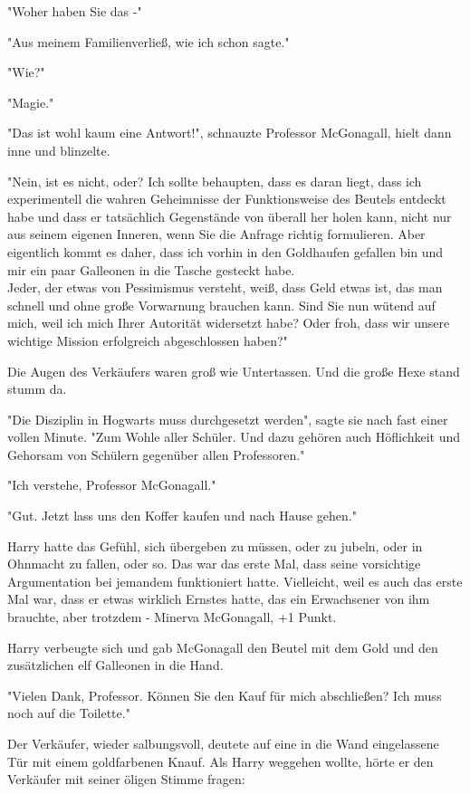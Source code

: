 {"Woher haben Sie das -"

"Aus meinem Familienverließ, wie ich schon sagte."

"Wie?"

"Magie."

"Das ist wohl kaum eine Antwort!", schnauzte Professor McGonagall, hielt dann inne und blinzelte.

"Nein, ist es nicht, oder? Ich sollte behaupten, dass es daran liegt, dass ich experimentell die wahren Geheimnisse der Funktionsweise des Beutels entdeckt habe und dass er tatsächlich Gegenstände von überall her holen kann, nicht nur aus seinem eigenen Inneren, wenn Sie die Anfrage richtig formulieren. Aber eigentlich kommt es daher, dass ich vorhin in den Goldhaufen gefallen bin und mir ein paar Galleonen in die Tasche gesteckt habe.\\ Jeder, der etwas von Pessimismus versteht, weiß, dass Geld etwas ist, das man schnell und ohne große Vorwarnung brauchen kann. Sind Sie nun wütend auf mich, weil ich mich Ihrer Autorität widersetzt habe? Oder froh, dass wir unsere wichtige Mission erfolgreich abgeschlossen haben?"

Die Augen des Verkäufers waren groß wie Untertassen. Und die große Hexe stand stumm da.

"Die Disziplin in Hogwarts muss durchgesetzt werden", sagte sie nach fast einer vollen Minute. "Zum Wohle aller Schüler. Und dazu gehören auch Höflichkeit und Gehorsam von Schülern gegenüber allen Professoren."

"Ich verstehe, Professor McGonagall."

"Gut. Jetzt lass uns den Koffer kaufen und nach Hause gehen."

Harry hatte das Gefühl, sich übergeben zu müssen, oder zu jubeln, oder in Ohnmacht zu fallen, oder so. Das war das erste Mal, dass seine vorsichtige Argumentation bei jemandem funktioniert hatte. Vielleicht, weil es auch das erste Mal war, dass er etwas wirklich Ernstes hatte, das ein Erwachsener von ihm brauchte, aber trotzdem - Minerva McGonagall, +1 Punkt.

Harry verbeugte sich und gab McGonagall den Beutel mit dem Gold und den zusätzlichen elf Galleonen in die Hand.

"Vielen Dank, Professor. Können Sie den Kauf für mich abschließen? Ich muss noch auf die Toilette."

Der Verkäufer, wieder salbungsvoll, deutete auf eine in die Wand eingelassene Tür mit einem goldfarbenen Knauf. Als Harry weggehen wollte, hörte er den Verkäufer mit seiner öligen Stimme fragen:

}
